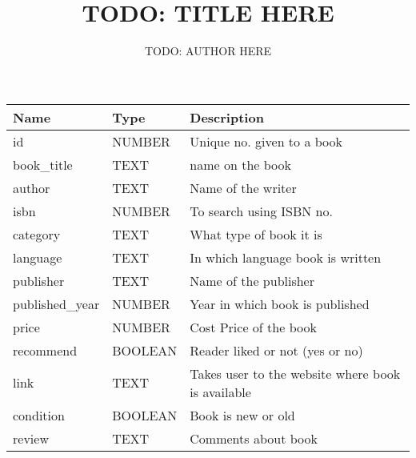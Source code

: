 \documentclass[10pt,a4paper]{article}
\title{TODO: TITLE HERE}
\author{TODO: AUTHOR HERE}
\begin{document}
\maketitle

\begin{tabularx}{\textwidth}{llX}
\toprule
\textbf{Name} & \textbf{Type} & \textbf{Description}\\
\midrule
id & NUMBER & Unique no. given to a book\\
book\_title & TEXT & name on the book\\
author & TEXT & Name of the writer\\
isbn & NUMBER & To search using ISBN no.\\
category & TEXT & What type of book it is\\
language & TEXT & In which language book is written\\
publisher & TEXT & Name of the publisher\\
published\_year & NUMBER & Year in which book is published\\
price & NUMBER & Cost Price of the book\\
recommend & BOOLEAN & Reader liked or not (yes or no)\\
link & TEXT & Takes user to the website where book is available\\
condition & BOOLEAN & Book is new or old\\
review & TEXT & Comments about book\\
\bottomrule
\end{tabularx}
\end{document}
